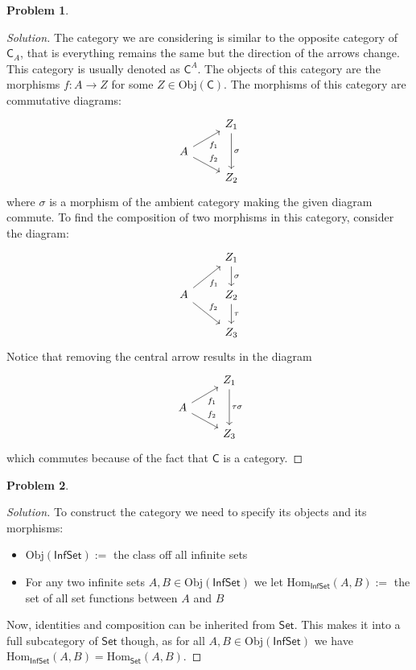 \documentclass{article}
\theoremstyle{definition}
\newtheorem{problem-internal}{Problem}[subsection]
\newenvironment{problem}{
	\medskip
	\begin{problem-internal}
	}{
\end{problem-internal}
}
\newenvironment{solution}{
	\begin{proof}[Solution]
		\vspace{-8px}
		\setlength{\parskip}{4px}
		\setlength{\parindent}{0px}
	}{
\end{proof}
}
\newcommand{\Obj}{\mathrm{Obj}}
\newcommand{\Hom}{\mathrm{Hom}}
\newcommand{\C}{\mathsf{C}}
\newcommand{\Cset}{\mathsf{Set}}
\begin{document}
\begin{problem}
\end{problem}

\begin{solution}
	The category we are considering is similar to the opposite category of $\C_A$, that is everything remains the same but the direction of the arrows change. This category is usually denoted as $\C^A$. The objects of this category are the morphisms $f : A \to Z$ for some $Z \in \Obj(\C)$. The morphisms of this category are commutative diagrams:
	\begin{equation*}
		\begin{tikzcd}[row sep=small]
			& Z_1 \arrow[dd, "\sigma"]\\
			A \arrow[ur, "f_1" swap]
			  \arrow[dr, "f_2"] & {} \\
			& Z_2
		\end{tikzcd}
	\end{equation*}
	where $\sigma$ is a morphism of the ambient category making the given diagram commute. To find the composition of two morphisms in this category, consider the diagram:
	\begin{equation*}
		\begin{tikzcd}
			& Z_1 \arrow[d, "\sigma"]\\
			A \arrow[ur, "f_1" swap]
			  \arrow[dr, "f_2"] & Z_2 \arrow[d, "\tau"] \\
			& Z_3
		\end{tikzcd}
	\end{equation*}
	Notice that removing the central arrow results in the diagram
	\begin{equation*}
		\begin{tikzcd}[row sep=small]
			& Z_1 \arrow[dd, "\tau\sigma"]\\
			A \arrow[ur, "f_1" swap]
			  \arrow[dr, "f_2"] & {} \\
			& Z_3
		\end{tikzcd}
	\end{equation*}
	which commutes because of the fact that $\C$ is a category.
\end{solution}

\begin{problem}
\end{problem}

\begin{solution}
	To construct the category we need to specify its objects and its morphisms:
	\begin{itemize}
		\item $\Obj(\mathsf{InfSet}) := $ the class off all infinite sets
		\item For any two infinite sets $A, B \in \Obj(\mathsf{InfSet})$ we let $\Hom_{\mathsf{InfSet}}(A,B) := $ the set of all set functions between $A$ and $B$
	\end{itemize}
	Now, identities and composition can be inherited from $\Cset$. This makes it into a full subcategory of $\Cset$ though, as for all $A, B \in \Obj(\mathsf{InfSet})$ we have $\Hom_{\mathsf{InfSet}}(A,B) = \Hom_{\Cset}(A,B)$.
\end{solution}
\end{document}

